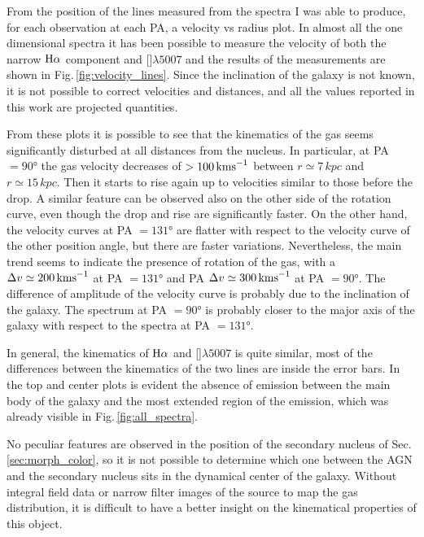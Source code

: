 \documentclass[../main.tex]{subfiles}
\begin{document}
From the position of the lines measured from the spectra I was able to produce, for each observation at each PA, a velocity vs radius plot.
In almost all the one dimensional spectra it has been possible to measure the velocity of both the narrow $\Ha$ component and []$\lambda5007$ and the results of the measurements are shown in Fig.\,\ref{fig:velocity_lines}.
Since the inclination of the galaxy is not known, it is not possible to correct velocities and distances, and all the values reported in this work are projected quantities.

From these plots it is possible to see that the kinematics of the gas seems significantly disturbed at all distances from the nucleus.
In particular, at PA $=\ang{90}$ the gas velocity decreases of $>100\,\si{\kms}$ between $r\simeq 7\,\si{kpc}$
and $r\simeq 15\,\si{kpc}$.
Then it starts to rise again up to velocities similar to those before the drop.
A similar feature can be observed also on the other side of the rotation curve, even though the drop and rise are significantly faster.
On the other hand, the velocity curves at PA $=\ang{131}$ are flatter with respect to the velocity curve of the other position angle, but there are faster variations.
Nevertheless, the main trend seems to indicate the presence of rotation of the gas, with a $\Delta v \simeq 200\,\si{\kms}$ at PA $=\ang{131}$ and PA $\Delta v \simeq 300\,\si{\kms}$ at PA $=\ang{90}$.
The difference of amplitude of the velocity curve is probably due to the inclination of the galaxy.
The spectrum at PA $=\ang{90}$ is probably closer to the major axis of the galaxy with respect to the spectra at PA $=\ang{131}$.

In general, the kinematics of $\Ha$ and []$\lambda5007$ is quite similar, most of the differences between the kinematics of the two lines are inside the error bars.
In the top and center plots is evident the absence of emission between the main body of the galaxy and the most extended region of the emission, which was already visible in Fig.\,\ref{fig:all_spectra}.

No peculiar features are observed in the position of the secondary nucleus of Sec.\,\ref{sec:morph_color}, so it is not possible to determine which one between the AGN and the secondary nucleus sits in the dynamical center of the galaxy.
Without integral field data or narrow filter images of the source to map the gas distribution, it is difficult to have a better insight on the kinematical properties of this object.
\end{document}
